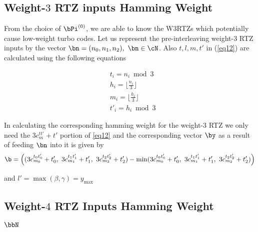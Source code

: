 \subsection{Weight-$3$ RTZ inputs Hamming Weight}
 From the choice of $\bPi^{(0)}$, we are able to know the W3RTZs which potentially cause low-weight turbo codes. 
 Let us represent the pre-interleaving  weight-$3$ RTZ inputs by the vector $\bn=(n_0,n_1,n_2),~\bn \in \cN$. Also $t,l,m,t'$ in (\ref{eq12}) are calculated using the following equations
 
 \begin{equation}
 \begin{split}
 &t_i=n_i \bmod 3\\
 &h_i=\Big\lfloor \frac{n_i}{3} \Big\rfloor\\
 &m_i=\Big\lfloor \frac{h_i}{3} \Big\rfloor\\
 &t'_i =h_i \bmod 3
 \end{split}
 \end{equation}

In calculating the corresponding hamming weight for the weight-$3$ RTZ we only need the $3c^{tt'}_{m}+t'$ portion of \ref{eq12} and the corresponding vector $\by$ as a result of feeding $\bn$ into it is given by
 $$\b=\Big((3c^{t_{0}t'_{0}}_{m_{0}}+t'_0,~3c^{t_{1}t'_{1}}_{m_{1}}+t'_1,~3c^{t_{2}t'_{2}}_{m_{2}}+t'_{2}) -\min(3c^{t_{0}t'_{0}}_{m_{0}}+t'_0,~3c^{t_{1}t'_{1}}_{m_{1}}+t'_1,~3c^{t_{2}t'_{2}}_{m_{2}}+t'_{2})\Big)$$
 
 and $l'=\max(\beta,\gamma)= y_{\max}$
 
 \subsection{Weight-$4$ RTZ Inputs Hamming Weight}
 $\bbN$